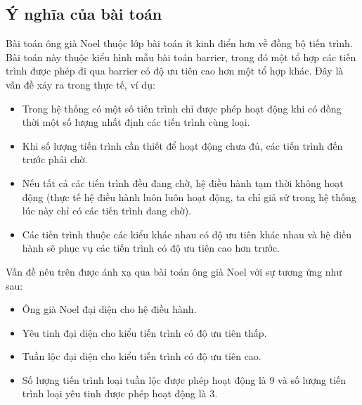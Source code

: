 \subsection{Ý nghĩa của bài toán}
Bài toán ông già Noel thuộc lớp bài toán ít kinh điển hơn về đồng bộ tiến trình. Bài toán này thuộc kiểu hình mẫu bài toán barrier, trong đó một tổ hợp các tiến trình được phép đi qua barrier có độ ưu tiên cao hơn một tổ hợp khác. Đây là vấn đề xảy ra trong thực tế, ví dụ:
\begin{itemize}
	\item Trong hệ thống có một số tiến trình chỉ được phép hoạt động khi có đồng thời một số lượng nhất định các tiến trình cùng loại.
	\item Khi số lượng tiến trình cần thiết để hoạt động chưa đủ, các tiến trình đến trước phải chờ. 
	\item Nếu tất cả các tiến trình đều đang chờ, hệ điều hành tạm thời không hoạt động (thực tế hệ điều hành luôn luôn hoạt động, ta chỉ giả sử trong hệ thống lúc này chỉ có các tiến trình đang chờ).
	\item Các tiến trình thuộc các kiểu khác nhau có độ ưu tiên khác nhau và hệ điều hành sẽ phục vụ các tiến trình có độ ưu tiên cao hơn trước.
\end{itemize}
Vấn đề nêu trên được ánh xạ qua bài toán ông già Noel với sự tương ứng như sau:
\begin{itemize}
	\item Ông già Noel đại diện cho hệ điều hành.
	\item Yêu tinh đại diện cho kiểu tiến trình có độ ưu tiên thấp.
	\item Tuần lộc đại diện cho kiểu tiến trình có độ ưu tiên cao.
	\item Số lượng tiến trình loại tuần lộc được phép hoạt động là 9 và số lượng tiến trình loại yêu tinh được phép hoạt động là 3.
\end{itemize}
